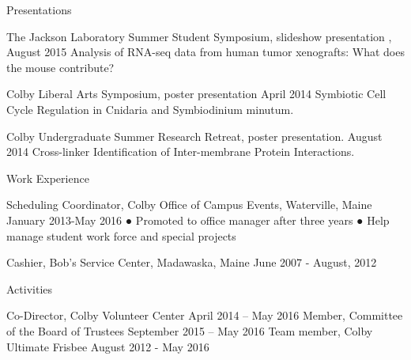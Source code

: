 \documentclass{article}
\begin{document}
	Presentations
	
	The Jackson Laboratory Summer Student Symposium, slideshow presentation ,                                                                   August 2015
	Analysis of RNA-seq data from human tumor xenografts: What does the mouse contribute?
	
	Colby Liberal Arts Symposium, poster presentation                                                                                                                   April 2014
	Symbiotic Cell Cycle Regulation in Cnidaria and Symbiodinium minutum.
	
	Colby Undergraduate Summer Research Retreat, poster presentation.						       August 2014
	Cross-linker Identification of Inter-membrane Protein Interactions.   
	
	Work Experience
	
	Scheduling Coordinator, Colby Office of Campus Events, Waterville, Maine                                                 January 2013-May 2016
	● Promoted to office manager after three years
	● Help manage student work force and special projects
	
	Cashier, Bob’s Service Center, Madawaska, Maine                                                                                         June 2007 - August, 2012
	
	Activities
	
	Co-Director, Colby Volunteer Center                                                                                                                  April 2014 – May 2016
	Member, Committee of the Board of Trustees       		                                                                  September 2015 – May 2016
	Team member, Colby Ultimate Frisbee                                                                                                              August 2012 - May 2016
\end{document}
